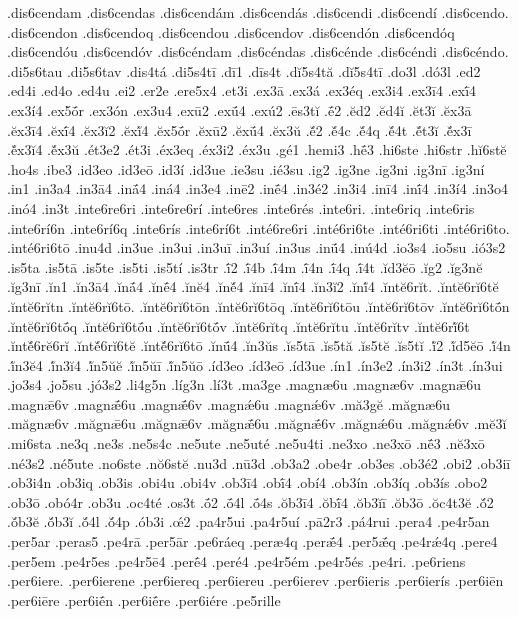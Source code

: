 {.dis6cendam
.dis6cendas
.dis6cendám
.dis6cendás
.dis6cendi
.dis6cendí
.dis6cendo.
.dis6cendon
.dis6cendoq
.dis6cendou
.dis6cendov
.dis6cendón
.dis6cendóq
.dis6cendóu
.dis6cendóv
.dis6céndam
.dis6céndas
.dis6cénde
.dis6céndi
.dis6céndo.
.di5s6tau
.di5s6tav
.dis4tá
.di5s4tī
.dī1
.dīs4t
.dĭ5s4tă
.dĭ5s4tī
.do3l
.dó3l
.ed2
.ed4i
.ed4o
.ed4u
.ei2
.er2e
.ere5x4
.et3i
.ex3ā
.ex3á
.ex3éq
.ex3i4
.ex3ī4
.exī́4
.ex3í4
.ex5ṓr
.ex3ón
.ex3u4
.exū2
.exū́4
.exú2
.ēs3tĭ
.ḗ2
.ĕd2
.ĕd4ĭ
.ĕt3ĭ
.ĕx3ā
.ĕx3ī4
.ĕxī́4
.ĕx3ĭ2
.ĕxĭ́4
.ĕx5ṓr
.ĕxū2
.ĕxū́4
.ĕx3ŭ
.ĕ́2
.ĕ́4c
.ĕ́4q
.ĕ́4t
.ĕ́t3ĭ
.ĕ́x3ī
.ĕ́x3ĭ4
.ĕ́x3ŭ
.ét3e2
.ét3i
.éx3eq
.éx3i2
.éx3u
.gé1
.hemi3
.hḗ3
.hi6ste
.hi6str
.hĭ6stĕ
.ho4s
.ibe3
.id3eo
.id3eō
.id3í
.id3ue
.ie3su
.ié3su
.ig2
.ig3ne
.ig3ni
.ig3nī
.ig3ní
.in1
.in3a4
.in3ā4
.inā́4
.iná4
.in3e4
.inē2
.inḗ4
.in3é2
.in3i4
.inī4
.inī́4
.in3í4
.in3o4
.inó4
.in3t
.inte6re6ri
.inte6re6rí
.inte6res
.inte6rés
.inte6ri.
.inte6riq
.inte6ris
.inte6rí6n
.inte6rí6q
.inte6rís
.inte6rí6t
.inté6re6ri
.inté6ri6te
.inté6ri6ti
.inté6ri6to.
.inté6ri6tō
.inu4d
.in3ue
.in3ui
.in3uī
.in3uí
.in3us
.inū́4
.inú4d
.io3s4
.io5su
.ió3s2
.is5ta
.is5tā
.is5te
.is5ti
.is5tí
.is3tr
.ī́2
.ī́4b
.ī́4m
.ī́4n
.ī́4q
.ī́4t
.ĭd3ĕō
.ĭg2
.ĭg3nĕ
.ĭg3nī
.ĭn1
.ĭn3ā4
.ĭnā́4
.ĭnḗ4
.ĭnĕ4
.ĭnĕ́4
.ĭnī4
.ĭnī́4
.ĭn3ĭ2
.ĭnĭ́4
.ĭntĕ6rĭt.
.ĭntĕ6rĭ6tĕ
.ĭntĕ6rĭtn
.ĭntĕ6rĭ6tō.
.ĭntĕ6rĭ6tōn
.ĭntĕ6rĭ6tōq
.ĭntĕ6rĭ6tōu
.ĭntĕ6rĭ6tōv
.ĭntĕ6rĭ6tṓn
.ĭntĕ6rĭ6tṓq
.ĭntĕ6rĭ6tṓu
.ĭntĕ6rĭ6tṓv
.ĭntĕ6rĭtq
.ĭntĕ6rĭtu
.ĭntĕ6rĭtv
.ĭntĕ6rĭ́6t
.ĭntĕ́6rĕ6rĭ
.ĭntĕ́6rĭ6tĕ
.ĭntĕ́6rĭ6tō
.ĭnū́4
.ĭn3ŭs
.ĭs5tā
.ĭs5tă
.ĭs5tĕ
.ĭs5tĭ
.ĭ́2
.ĭ́d5ĕō
.ĭ́4n
.ĭ́n3ĕ4
.ĭ́n3ĭ4
.ĭ́n5ŭĕ
.ĭ́n5ŭī
.ĭ́n5ŭō
.íd3eo
.íd3eō
.íd3ue
.ín1
.ín3e2
.ín3i2
.ín3t
.ín3ui
.jo3s4
.jo5su
.jó3s2
.li4g5n
.líg3n
.lí3t
.ma3ge
.magnæ6u
.magnæ6v
.magnǣ6u
.magnǣ6v
.magnǣ́6u
.magnǣ́6v
.magnǽ6u
.magnǽ6v
.mă3gĕ
.măgnæ6u
.măgnæ6v
.măgnǣ6u
.măgnǣ6v
.măgnǣ́6u
.măgnǣ́6v
.măgnǽ6u
.măgnǽ6v
.mĕ3ĭ
.mi6sta
.ne3q
.ne3s
.ne5s4c
.ne5ute
.ne5uté
.ne5u4ti
.ne3xo
.ne3xō
.nḗ3
.nĕ3xō
.né3s2
.né5ute
.no6ste
.nŏ6stĕ
.nu3d
.nū3d
.ob3a2
.obe4r
.ob3es
.ob3é2
.obi2
.ob3iī
.ob3i4n
.ob3iq
.ob3is
.obi4u
.obi4v
.ob3ī4
.obī́4
.obí4
.ob3ín
.ob3íq
.ob3ís
.obo2
.ob3ō
.obó4r
.ob3u
.oc4té
.os3t
.ṓ2
.ṓ4l
.ṓ4s
.ŏb3ī4
.ŏbī́4
.ŏb3ĭī
.ŏb3ō
.ŏc4t3ĕ
.ŏ́2
.ŏ́b3ĕ
.ŏ́b3ĭ
.ŏ́4l
.ŏ́4p
.ób3i
.œ́2
.pa4r5ui
.pa4r5uí
.pā2r3
.pá4rui
.pera4
.pe4r5an
.per5ar
.peras5
.pe4rā
.per5ār
.pe6ráeq
.peræ4q
.perǣ́4
.per5ǣ́q
.pe4rǽ4q
.pere4
.per5em
.pe4r5es
.pe4r5ē4
.perḗ4
.peré4
.pe4r5ém
.pe4r5és
.pe4ri.
.pe6riens
.per6iere.
.per6ierene
.per6iereq
.per6iereu
.per6ierev
.per6ieris
.per6ierís
.per6iēn
.per6iēre
.per6iḗn
.per6iḗre
.per6iére
.pe5rille
}
